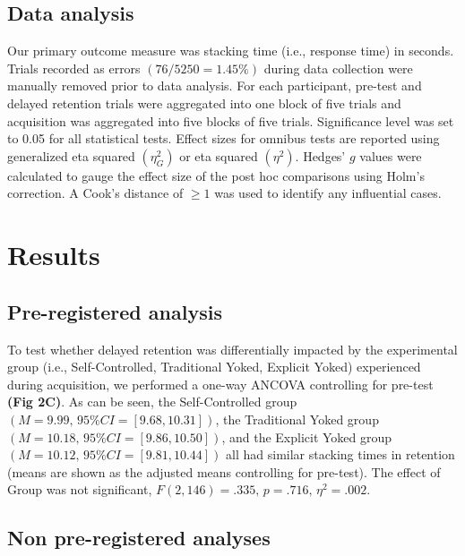 \documentclass[
  english,
  jou]{apa7}
\begin{document}
\hypertarget{data-analysis}{%
\subsection{Data analysis}\label{data-analysis}}

Our primary outcome measure was stacking time (i.e., response time) in seconds. Trials recorded as errors \((76/5250 = 1.45\%)\) during data collection were manually removed prior to data analysis. For each participant, pre-test and delayed retention trials were aggregated into one block of five trials and acquisition was aggregated into five blocks of five trials. Significance level was set to 0.05 for all statistical tests. Effect sizes for omnibus tests are reported using generalized eta squared \((\eta^2_{G})\) or eta squared \((\eta^2)\). Hedges' \(g\) values were calculated to gauge the effect size of the post hoc comparisons using Holm's correction. A Cook's distance of \(\geq 1\) was used to identify any influential cases.

\hypertarget{results}{%
\section{Results}\label{results}}

\hypertarget{pre-registered-analysis}{%
\subsection{Pre-registered analysis}\label{pre-registered-analysis}}

To test whether delayed retention was differentially impacted by the experimental group (i.e., Self-Controlled, Traditional Yoked, Explicit Yoked) experienced during acquisition, we performed a one-way ANCOVA controlling for pre-test \textbf{(Fig 2C)}. As can be seen, the Self-Controlled group \((M = 9.99, \,95\%CI = [9.68,10.31])\), the Traditional Yoked group \((M = 10.18, \,95\%CI = [9.86,10.50])\), and the Explicit Yoked group \((M = 10.12, \,95\%CI = [9.81,10.44])\) all had similar stacking times in retention (means are shown as the adjusted means controlling for pre-test). The effect of Group was not significant, \(F(2,146) = .335, \,p = .716, \,\eta^2 = .002\).

\hypertarget{non-pre-registered-analyses}{%
\subsection{Non pre-registered analyses}\label{non-pre-registered-analyses}}
\end{document}
